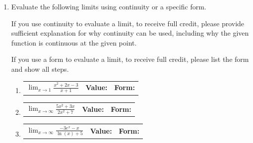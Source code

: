 \documentclass[11pt]{article}
\begin{document}
\begin{enumerate}

\item Evaluate the following limits using continuity or a specific form.

If you use continuity to evaluate a limit, to receive full credit, please provide sufficient explanation for why continuity can be used, including why the given function is continuous at the given point.

If you use a form to evaluate a limit, to receive full credit, please list the form and show all steps. 
\vspace{5em}

\begin{enumerate}
    \item 
    \begin{tabularx}{\textwidth}{lX X}
        $\displaystyle \lim_{x\to 1} \frac{x^2 + 2x - 3}{x+1}$ & 
        \textbf{Value:} \hrulefill & 
        \textbf{Form:} \hrulefill
    \end{tabularx}
    
    \vspace{15em}


    \item 
    \begin{tabularx}{\textwidth}{lX X}
        $\displaystyle \lim_{x\to \infty} \frac{5x^2 + 3x}{2x^2 + 7}$ & 
        \textbf{Value:} \hrulefill & 
        \textbf{Form:} \hrulefill
    \end{tabularx}
    
    \vspace{15em}

    \item 
    \begin{tabularx}{\textwidth}{lX X}
        $\displaystyle \lim_{x\to \infty} \frac{-3e^x - x}{\ln(x) + 5}$ & 
        \textbf{Value:} \hrulefill & 
        \textbf{Form:} \hrulefill
    \end{tabularx}

\end{enumerate}





\end{enumerate}
\end{document}
